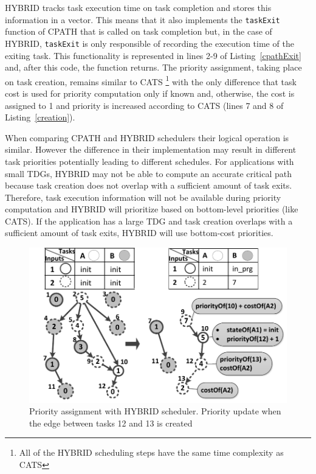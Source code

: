 HYBRID tracks task execution time on task completion and stores this information in a vector.
This means that it also implements the \texttt{taskExit} function of CPATH that is called on task completion but, in the case of HYBRID, \texttt{taskExit} is only responsible of recording the execution time of the exiting task.
This functionality is represented in lines 2-9 of Listing~\ref{cpathExit} and, after this code, the function returns.
The priority assignment, taking place on task creation, remains similar to CATS \footnote{All of the HYBRID scheduling steps have the same time complexity as CATS} with the only difference that task cost is used for priority computation only if known and, otherwise, the cost is assigned to 1 and priority is increased according to CATS (lines 7 and 8 of Listing~\ref{creation}).

When comparing CPATH and HYBRID schedulers their logical operation is similar.
However the difference in their implementation may result in different task priorities potentially leading to different schedules.
For applications with small TDGs, HYBRID may not be able to compute an accurate critical path because task creation does not overlap with a sufficient amount of task exits.
Therefore, task execution information will not be available during priority computation and HYBRID will prioritize based on bottom-level priorities (like CATS).
If the application has a large TDG and task creation overlaps with a sufficient amount of task exits, HYBRID will use bottom-cost priorities.

\begin{figure}[t]
\includegraphics[width=\columnwidth]{images/hybrid_prioritization.pdf} 
\centering
\caption{Priority assignment with HYBRID scheduler. Priority update when the edge between tasks 12 and 13 is created}
\label{hybrid_priorities}
\vspace{-0.5cm}
\end{figure} 

